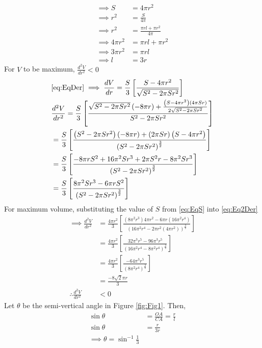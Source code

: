 \documentclass[12pt]{article}
\providecommand{\brak}[1]{\ensuremath{\left(#1\right)}}
\providecommand{\sbrak}[1]{\ensuremath{{}\left[#1\right]}}
\begin{document}
\begin{enumerate}
\begin{enumerate}
\begin{align}
	\label{eq:EqS}
	\implies S &= 4\pi r^2 \\
	\implies r^2 &= \frac{S}{4\pi} \\
	\implies r^2 &= \frac{\pi rl+\pi r^2}{4\pi} \\
	\implies 4\pi r^2 &= \pi rl+ \pi r^2 \\
        \implies 3\pi r^2 &= \pi rl \\
	\implies l &= 3r 
\end{align}
For $V$ to be maximum, $\frac{d^2V}{dr^2} < 0$ 
\begin{align}
	& \eqref{eq:EqDer}\implies \frac{dV}{dr} = \frac{S}{3}\sbrak{\frac{S-4\pi r^2}{\sqrt{S^2-2\pi Sr^2}}} \\ 
	& \frac{d^2V}{dr^2} =  \frac{S}{3}\sbrak{\frac{\sqrt{S^2-2\pi Sr^2}\brak{-8\pi r} + \frac{\brak{S-4\pi r^2}\brak{4\pi Sr}}{2\sqrt{S^2-2\pi Sr^2}}}{S^2-2\pi Sr^2}} \\ 
	&=  \frac{S}{3}\sbrak{\frac{\brak{S^2-2\pi Sr^2}\brak{-8\pi r} + \brak{2\pi Sr}\brak{S-4\pi r^2}}{\brak{S^2-2\pi Sr^2}^\frac{3}{2}}} \\ 
	&=  \frac{S}{3}\sbrak{\frac{-8\pi rS^2 + 16\pi^2Sr^3+ 2\pi S^2r - 8\pi^2Sr^3 }{\brak{S^2-2\pi Sr^2}^\frac{3}{2}}} \\ 
	\label{eq:Eq2Der}
	&=  \frac{S}{3}\sbrak{\frac{8\pi^2Sr^3-6\pi rS^2}{\brak{S^2-2\pi Sr^2}^\frac{3}{2}}} 
\end{align}
For maximum volume, substituting the value of $S$ from \eqref{eq:EqS} into \eqref{eq:Eq2Der}
\begin{align}
	\implies \frac{d^2V}{dr^2} &=  \frac{4\pi r^2}{3}\sbrak{\frac{\brak{8\pi^2r^3}4\pi r^2-6\pi r\brak{16\pi^2r^4}}{\brak{16\pi^2r^4-2\pi r^2\brak{4\pi r^2}}^\frac{3}{2}}} \\ 
	&=  \frac{4\pi r^2}{3}\sbrak{\frac{32\pi^3 r^5 - 96\pi^3 r^5}{\brak{16\pi^2r^4-8\pi^2 r^4}^\frac{3}{2}}} \\ 
	&=  \frac{4\pi r^2}{3}\sbrak{\frac{-64\pi^3 r^5}{\brak{8\pi^2 r^4}^\frac{3}{2}}} \\ 
	&= \frac{-8\sqrt{2}\pi r}{3} \\
	\therefore \frac{d^2V}{dr^2} &< 0 
\end{align}
Let $\theta$ be the semi-vertical angle in Figure \ref{fig:Fig1}. Then,
\begin{align}
	\sin\theta &= \frac{OA}{CA} = \frac{r}{l} \\
	\sin\theta &= \frac{r}{3r} \\
	\implies \theta = \sin^{-1}\frac{1}{3}
\end{align}

\end{enumerate}
\end{enumerate}
\end{document}
